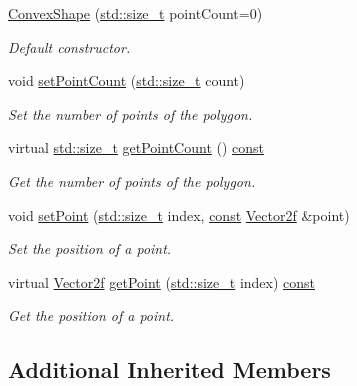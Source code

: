 \begin{DoxyCompactItemize}
\hyperlink{classsf_1_1_convex_shape_af9981b8909569b381b3fccf32fc69856}{Convex\-Shape} (\hyperlink{nc__alloc_8h_a7b60c5629e55e8ec87a4547dd4abced4}{std\-::size\-\_\-t} point\-Count=0)
\begin{DoxyCompactList}\small\item\em Default constructor. \end{DoxyCompactList}\item 
void \hyperlink{classsf_1_1_convex_shape_a56e6e79ade6dd651cc1a0e39cb68deae}{set\-Point\-Count} (\hyperlink{nc__alloc_8h_a7b60c5629e55e8ec87a4547dd4abced4}{std\-::size\-\_\-t} count)
\begin{DoxyCompactList}\small\item\em Set the number of points of the polygon. \end{DoxyCompactList}\item 
virtual \hyperlink{nc__alloc_8h_a7b60c5629e55e8ec87a4547dd4abced4}{std\-::size\-\_\-t} \hyperlink{classsf_1_1_convex_shape_a8c420c1fc0f51706a15509ab53278f4a}{get\-Point\-Count} () \hyperlink{term__entry_8h_a57bd63ce7f9a353488880e3de6692d5a}{const} 
\begin{DoxyCompactList}\small\item\em Get the number of points of the polygon. \end{DoxyCompactList}\item 
void \hyperlink{classsf_1_1_convex_shape_a5929e0ab0ba5ca1f102b40c234a8e92d}{set\-Point} (\hyperlink{nc__alloc_8h_a7b60c5629e55e8ec87a4547dd4abced4}{std\-::size\-\_\-t} index, \hyperlink{term__entry_8h_a57bd63ce7f9a353488880e3de6692d5a}{const} \hyperlink{namespacesf_a80cea3c46537294fd1d8d428566ad8b2}{Vector2f} \&point)
\begin{DoxyCompactList}\small\item\em Set the position of a point. \end{DoxyCompactList}\item 
virtual \hyperlink{namespacesf_a80cea3c46537294fd1d8d428566ad8b2}{Vector2f} \hyperlink{classsf_1_1_convex_shape_acc954374da2ca7fe58a0cccbf6d1e6e5}{get\-Point} (\hyperlink{nc__alloc_8h_a7b60c5629e55e8ec87a4547dd4abced4}{std\-::size\-\_\-t} index) \hyperlink{term__entry_8h_a57bd63ce7f9a353488880e3de6692d5a}{const} 
\begin{DoxyCompactList}\small\item\em Get the position of a point. \end{DoxyCompactList}\end{DoxyCompactItemize}
\subsection*{Additional Inherited Members}


